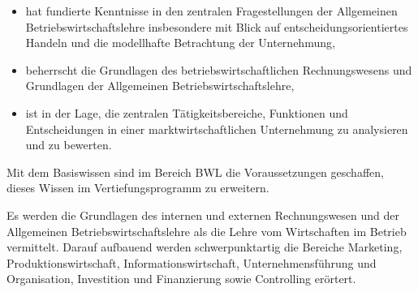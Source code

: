 \begin{module}
\begin{learningoutcomes}
 \begin{itemize}\item hat fundierte Kenntnisse in den zentralen Fragestellungen der Allgemeinen Betriebswirtschaftslehre insbesondere mit Blick auf entscheidungsorientiertes Handeln und die modellhafte Betrachtung der Unternehmung,  \item beherrscht die Grundlagen des betriebswirtschaftlichen Rechnungswesens und Grundlagen der Allgemeinen Betriebswirtschaftslehre,   \item ist in der Lage, die zentralen Tätigkeitsbereiche, Funktionen und Entscheidungen in einer marktwirtschaftlichen Unternehmung zu analysieren und zu bewerten.  \end{itemize}

Mit dem Basiswissen sind im Bereich BWL die Voraussetzungen geschaffen, dieses Wissen im Vertiefungsprogramm zu erweitern.


\end{learningoutcomes}

\begin{content}
Es werden die Grundlagen des internen und externen Rechnungswesen und der Allgemeinen Betriebswirtschaftslehre als die Lehre vom Wirtschaften im Betrieb vermittelt. Darauf aufbauend werden schwerpunktartig die Bereiche Marketing, Produktionswirtschaft, Informationswirtschaft, Unternehmensführung und Organisation, Investition und Finanzierung sowie Controlling erörtert.


\end{content}



\end{module}

